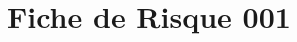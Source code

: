 \documentclass[asi]{picINSA}
\title{\PRO{}}
\author{\Pierre}
\begin{document}
\couverture{}

\informationsGenerales{}

 
\chapter*{Fiche de Risque 001}

\end{document}
